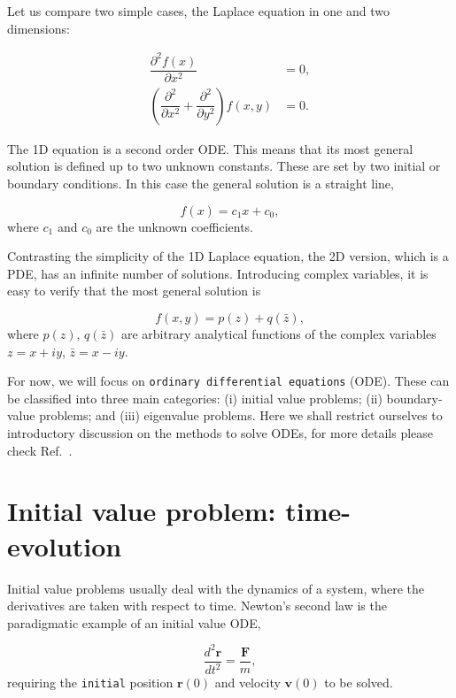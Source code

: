 Let us compare two simple cases, the Laplace equation in one and two dimensions:

\begin{align}
 \dfrac{\partial^2 f(x)}{\partial x^2} &= 0,\\
 \left(\dfrac{\partial^2}{\partial x^2} + \dfrac{\partial^2}{\partial y^2}\right)f(x,y) &= 0.
\end{align}

The 1D equation is a second order ODE. This means that its most general solution is defined up to two unknown constants. These are set by two initial or boundary conditions. In this case the general solution is a straight line,

\begin{equation}
 f(x) = c_1x + c_0,
\end{equation}
where $c_1$ and $c_0$ are the unknown coefficients.

Contrasting the simplicity of the 1D Laplace equation, the 2D version, which is a PDE, has an infinite number of solutions. Introducing complex variables, it is easy to verify that the most general solution is

\begin{equation}
 f(x,y) = p(z) + q(\bar{z}),
\end{equation}
where $p(z)$, $q(\bar{z})$ are arbitrary analytical functions of the complex variables $z = x+iy$, $\bar{z} = x-iy$.

For now, we will focus on \texttt{ordinary differential equations} (ODE). These can be classified into three main categories: (i) initial value problems; (ii) boundary-value problems; and (iii) eigenvalue problems. Here we shall restrict ourselves to introductory discussion on the methods to solve ODEs, for more details please check Ref.~\cite{JCButcher2008NumericalODE, pang2006introduction}.


\section{Initial value problem: time-evolution}

Initial value problems usually deal with the dynamics of a system, where the derivatives are taken with respect to time. Newton's second law is the paradigmatic example of an initial value ODE,

\begin{equation}
 \dfrac{d^2 \bm{r}}{dt^2} = \dfrac{\bm{F}}{m},
\end{equation}
requiring the \texttt{initial} position $\bm{r}(0)$ and velocity $\bm{v}(0)$ to be solved.

